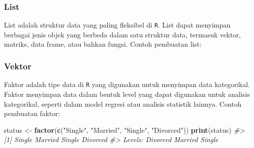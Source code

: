 \documentclass[
  oneside]{book}
\newenvironment{Shaded}{\begin{snugshade}}{\end{snugshade}}
\newcommand{\AttributeTok}[1]{\textcolor[rgb]{0.13,0.29,0.53}{#1}}
\newcommand{\CommentTok}[1]{\textcolor[rgb]{0.56,0.35,0.01}{\textit{#1}}}
\newcommand{\DecValTok}[1]{\textcolor[rgb]{0.00,0.00,0.81}{#1}}
\newcommand{\FunctionTok}[1]{\textcolor[rgb]{0.13,0.29,0.53}{\textbf{#1}}}
\newcommand{\NormalTok}[1]{#1}
\newcommand{\OtherTok}[1]{\textcolor[rgb]{0.56,0.35,0.01}{#1}}
\newcommand{\StringTok}[1]{\textcolor[rgb]{0.31,0.60,0.02}{#1}}
\begin{document}
\subsubsection*{List}\label{list}

List adalah struktur data yang paling fleksibel di \texttt{R}. List
dapat menyimpan berbagai jenis objek yang berbeda dalam satu struktur
data, termasuk vektor, matriks, data frame, atau bahkan fungsi. Contoh
pembuatan list:

\begin{Shaded}
\end{Shaded}

\subsubsection*{Vektor}\label{vektor-1}

Faktor adalah tipe data di \texttt{R} yang digunakan untuk
menyimpan data kategorikal. Faktor menyimpan data dalam bentuk level
yang dapat digunakan untuk analisis kategorikal, seperti dalam model
regresi atau analisis statistik lainnya. Contoh pembuatan faktor:

\begin{Shaded}
\begin{Highlighting}[]
\NormalTok{status }\OtherTok{\textless{}{-}} \FunctionTok{factor}\NormalTok{(}\FunctionTok{c}\NormalTok{(}\StringTok{"Single"}\NormalTok{, }\StringTok{"Married"}\NormalTok{, }\StringTok{"Single"}\NormalTok{, }\StringTok{"Divorced"}\NormalTok{))}
\FunctionTok{print}\NormalTok{(status)}
\CommentTok{\#\textgreater{} [1] Single   Married  Single   Divorced}
\CommentTok{\#\textgreater{} Levels: Divorced Married Single}
\end{Highlighting}
\end{Shaded}
\end{document}
